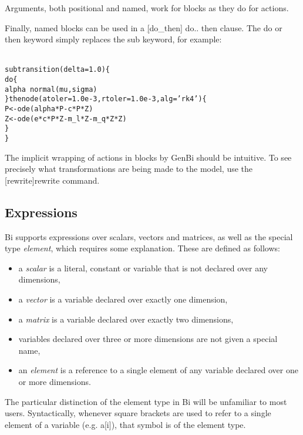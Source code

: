 Arguments, both positional and named, work for blocks as they do for actions.

Finally, named blocks can be used in a \hyperref[hyper][do_then]{\sf
  do.. then} clause. The \textsf{do} or \textsf{then} keyword
simply replaces the \textsf{sub} keyword, for example:
\begin{alltt}{\sf
    sub transition(delta = 1.0) \{
      do \{
        alpha ~ normal(mu, sigma)
      \} then ode(atoler = 1.0e-3, rtoler = 1.0e-3, alg = 'rk4') \{
        P <- ode(alpha*P - c*P*Z)
        Z <- ode(e*c*P*Z - m_l*Z - m_q*Z*Z)
      \}
    \}
}\end{alltt}

The implicit wrapping of actions in blocks by GenBi should be intuitive. To
see precisely what transformations are being made to the model, use the
\hyperref[hyper][rewrite]{\sf rewrite} command.

\subsection{Expressions\label{Expressions}}

Bi supports expressions over scalars, vectors and matrices, as well as the
special type \textit{element}, which requires some explanation. These are
defined as follows:
\begin{itemize}

\item a \textit{scalar} is a literal, constant or variable that
  is not declared over any dimensions,

\item a \textit{vector} is a variable declared over
  exactly one dimension,

\item a \textit{matrix} is a variable declared over exactly two
  dimensions,

\item variables declared over three or more dimensions are not given a special
  name,

\item an \textit{element} is a reference to a single element of any
  variable declared over one or more dimensions.

\end{itemize}

The particular distinction of the element type in Bi will be unfamiliar to
most users. Syntactically, whenever square brackets are used to refer to a
single element of a variable (e.g. \textsf{a[i]}), that symbol is of the
element type.

